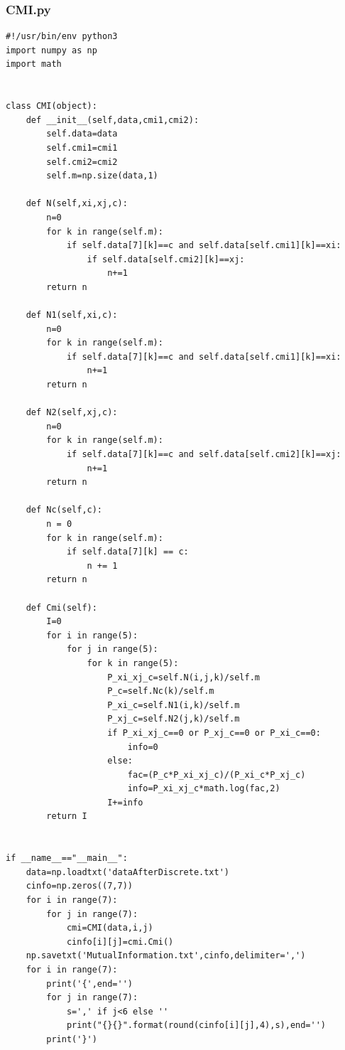 \documentclass{ctexart}
\begin{document}
\subsubsection*{CMI.py}
\begin{scriptsize}
\begin{verbatim}
#!/usr/bin/env python3
import numpy as np
import math


class CMI(object):
    def __init__(self,data,cmi1,cmi2):
        self.data=data
        self.cmi1=cmi1
        self.cmi2=cmi2
        self.m=np.size(data,1)

    def N(self,xi,xj,c):
        n=0
        for k in range(self.m):
            if self.data[7][k]==c and self.data[self.cmi1][k]==xi:
                if self.data[self.cmi2][k]==xj:
                    n+=1
        return n

    def N1(self,xi,c):
        n=0
        for k in range(self.m):
            if self.data[7][k]==c and self.data[self.cmi1][k]==xi:
                n+=1
        return n

    def N2(self,xj,c):
        n=0
        for k in range(self.m):
            if self.data[7][k]==c and self.data[self.cmi2][k]==xj:
                n+=1
        return n

    def Nc(self,c):
        n = 0
        for k in range(self.m):
            if self.data[7][k] == c:
                n += 1
        return n

    def Cmi(self):
        I=0
        for i in range(5):
            for j in range(5):
                for k in range(5):
                    P_xi_xj_c=self.N(i,j,k)/self.m
                    P_c=self.Nc(k)/self.m
                    P_xi_c=self.N1(i,k)/self.m
                    P_xj_c=self.N2(j,k)/self.m
                    if P_xi_xj_c==0 or P_xj_c==0 or P_xi_c==0:
                        info=0
                    else:
                        fac=(P_c*P_xi_xj_c)/(P_xi_c*P_xj_c)
                        info=P_xi_xj_c*math.log(fac,2)
                    I+=info
        return I


if __name__=="__main__":
    data=np.loadtxt('dataAfterDiscrete.txt')
    cinfo=np.zeros((7,7))
    for i in range(7):
        for j in range(7):
            cmi=CMI(data,i,j)
            cinfo[i][j]=cmi.Cmi()
    np.savetxt('MutualInformation.txt',cinfo,delimiter=',')
    for i in range(7):
        print('{',end='')
        for j in range(7):
            s=',' if j<6 else ''
            print("{}{}".format(round(cinfo[i][j],4),s),end='')
        print('}')

\end{verbatim}
\end{scriptsize}
\end{document}
